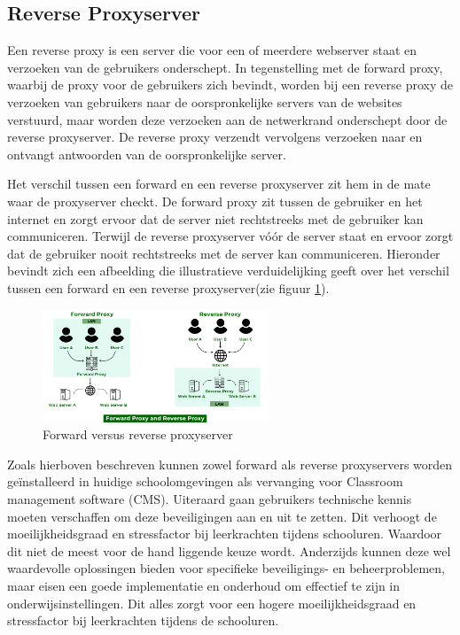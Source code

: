 \subsection{Reverse Proxyserver}
Een reverse proxy is een server die voor een of meerdere webserver staat en verzoeken van de gebruikers onderschept. In tegenstelling met de forward proxy, waarbij de proxy voor de gebruikers zich bevindt, worden bij een reverse proxy de verzoeken van gebruikers naar de oorspronkelijke servers van de websites verstuurd, maar worden deze verzoeken aan de netwerkrand onderschept door de reverse proxyserver. De reverse proxy verzendt vervolgens verzoeken naar en ontvangt antwoorden van de oorspronkelijke server.\newline

Het verschil tussen een forward en een reverse proxyserver zit hem in de mate waar de proxyserver checkt. De forward proxy zit tussen de gebruiker en het internet en zorgt ervoor dat de server niet rechtstreeks met de gebruiker kan communiceren. Terwijl de reverse proxyserver vóór de server staat en ervoor zorgt dat de gebruiker nooit rechtstreeks met de server kan communiceren. Hieronder bevindt zich een afbeelding die illustratieve verduidelijking geeft over het verschil tussen een forward en een reverse proxyserver(zie figuur \ref{fig:Forward versus reverse proxyserver}). \autocite{mckenzie-2022}


\begin{figure}[h]
    \centering
    \includegraphics[width=0.6\textwidth]{graphics/Forward-Proxy-and-Reverse-Proxy.png}
    \caption{Forward versus reverse proxyserver \textcite{gfg-2023}}
    \label{fig:Forward versus reverse proxyserver} 
\end{figure}

Zoals hierboven beschreven kunnen zowel forward als reverse proxyservers worden geïnstalleerd in huidige schoolomgevingen als vervanging voor Classroom management software (CMS). Uiteraard gaan gebruikers technische kennis moeten verschaffen om deze beveiligingen aan en uit te zetten. Dit verhoogt de moeilijkheidsgraad en stressfactor bij leerkrachten tijdens schooluren. Waardoor dit niet de meest voor de hand liggende keuze wordt. Anderzijds kunnen deze wel waardevolle oplossingen bieden voor specifieke beveiligings- en beheerproblemen, maar eisen een goede implementatie en onderhoud om effectief te zijn in onderwijsinstellingen. Dit alles zorgt voor een hogere moeilijkheidsgraad en stressfactor bij leerkrachten tijdens de schooluren. 

